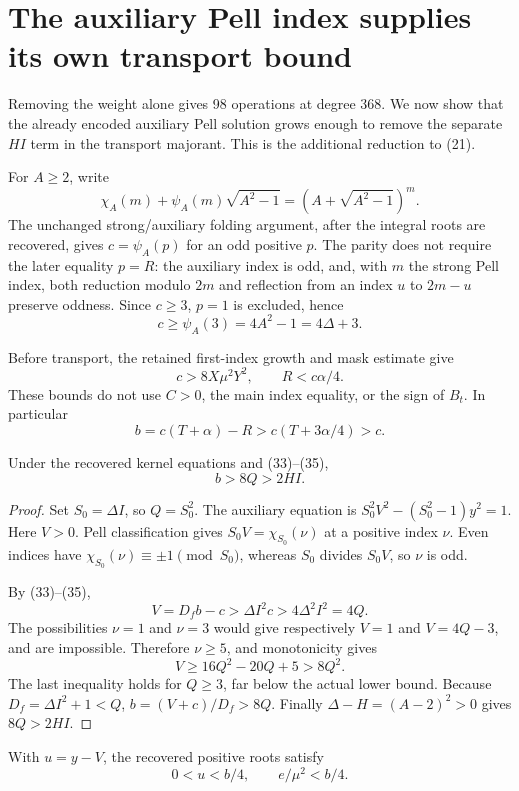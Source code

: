 \section{The auxiliary Pell index supplies its own transport bound}
\label{sec:transport}

Removing the weight alone gives 98 operations at degree 368.
We now show that the already encoded auxiliary Pell solution grows enough
to remove the separate $HI$ term in the transport majorant.
This is the additional reduction to (21).

For $A\ge2$, write
\[
\chi_A(m)+\psi_A(m)\sqrt{A^2-1}
=(A+\sqrt{A^2-1})^m.
\]
The unchanged strong/auxiliary folding argument, after the integral roots
are recovered, gives $c=\psi_A(p)$ for an odd positive $p$.
The parity does not require the later equality $p=R$:
the auxiliary index is odd, and, with $m$ the strong Pell index, both
reduction modulo $2m$ and reflection
from an index $u$ to $2m-u$ preserve oddness.
Since $c\ge3$, $p=1$ is excluded, hence
\[
c\ge\psi_A(3)=4A^2-1=4\Delta+3.
\tag{33}
\]

Before transport, the retained first-index growth and mask estimate give
\[
c>8X\mu^2Y^2,\qquad R<c\alpha/4.
\tag{34}
\]
These bounds do not use $C>0$, the main index equality, or the sign of
$B_t$. In particular
\[
b=c(T+\alpha)-R>c(T+3\alpha/4)>c.
\tag{35}
\]

\begin{lemma}
\label{lem:auxfive}
Under the recovered kernel equations and (33)--(35),
\[
b>8Q>2HI.
\tag{36}
\]
\end{lemma}

\begin{proof}
Set $S_0=\Delta I$, so $Q=S_0^2$.
The auxiliary equation is
$S_0^2V^2-(S_0^2-1)y^2=1$.
Here $V>0$. Pell classification gives
$S_0V=\chi_{S_0}(\nu)$ at a positive index $\nu$.
Even indices have $\chi_{S_0}(\nu)\equiv\pm1\pmod{S_0}$,
whereas $S_0$ divides $S_0V$, so $\nu$ is odd.

By (33)--(35),
\[
V=D_fb-c>\Delta I^2c>4\Delta^2I^2=4Q.
\]
The possibilities $\nu=1$ and $\nu=3$ would give respectively
$V=1$ and $V=4Q-3$, and are impossible.
Therefore $\nu\ge5$, and monotonicity gives
\[
V\ge16Q^2-20Q+5>8Q^2.
\tag{37}
\]
The last inequality holds for $Q\ge3$, far below the actual lower bound.
Because $D_f=\Delta I^2+1<Q$,
$b=(V+c)/D_f>8Q$.
Finally $\Delta-H=(A-2)^2>0$ gives $8Q>2HI$.
\end{proof}

\begin{lemma}
\label{lem:quarter}
With $u=y-V$, the recovered positive roots satisfy
\[
0<u<b/4,\qquad e/\mu^2<b/4.
\tag{38}
\]
\end{lemma}


